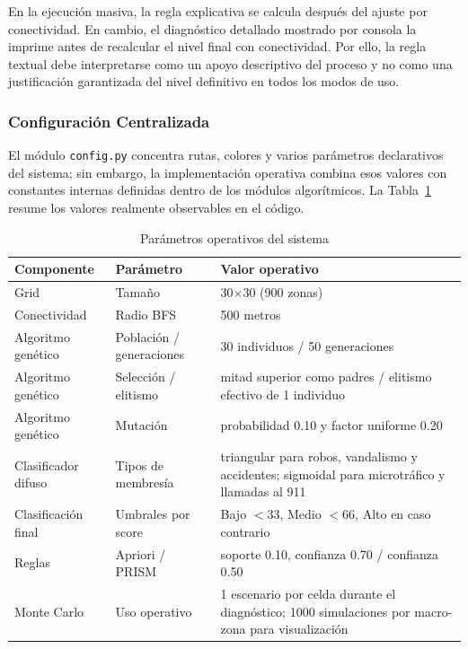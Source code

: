 \documentclass[11pt]{article}
\begin{document}
En la ejecución masiva, la regla explicativa se calcula después del ajuste por conectividad. En cambio, el diagnóstico detallado mostrado por consola la imprime antes de recalcular el nivel final con conectividad. Por ello, la regla textual debe interpretarse como un apoyo descriptivo del proceso y no como una justificación garantizada del nivel definitivo en todos los modos de uso.

\subsubsection{Configuración Centralizada}

El módulo \texttt{config.py} concentra rutas, colores y varios parámetros declarativos del sistema; sin embargo, la implementación operativa combina esos valores con constantes internas definidas dentro de los módulos algorítmicos. La Tabla~\ref{tab:parametros-operativos} resume los valores realmente observables en el código.

\begin{table}[H]
    \centering
    \begin{tabular}{p{3.4cm}p{3.4cm}p{6.8cm}}
        \toprule
        \textbf{Componente} & \textbf{Parámetro} & \textbf{Valor operativo} \\
        \midrule
        Grid & Tamaño & 30×30 (900 zonas) \\
        Conectividad & Radio BFS & 500 metros \\
        Algoritmo genético & Población / generaciones & 30 individuos / 50 generaciones \\
        Algoritmo genético & Selección / elitismo & mitad superior como padres / elitismo efectivo de 1 individuo \\
        Algoritmo genético & Mutación & probabilidad 0.10 y factor uniforme 0.20 \\
        Clasificador difuso & Tipos de membresía & triangular para robos, vandalismo y accidentes; sigmoidal para microtráfico y llamadas al 911 \\
        Clasificación final & Umbrales por score & Bajo $< 33$, Medio $< 66$, Alto en caso contrario \\
        Reglas & Apriori / PRISM & soporte 0.10, confianza 0.70 / confianza 0.50 \\
        Monte Carlo & Uso operativo & 1 escenario por celda durante el diagnóstico; 1000 simulaciones por macro-zona para visualización \\
        \bottomrule
    \end{tabular}
    \caption{Parámetros operativos del sistema}
    \label{tab:parametros-operativos}
\end{table}
\end{document}
